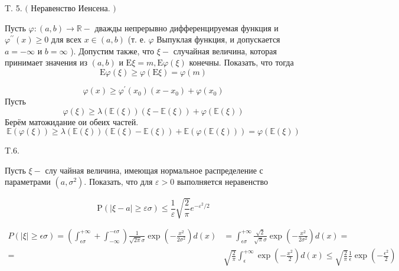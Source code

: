 \documentclass[a4paper,12pt]{article} %
\begin{document}
\begin{example} T. 5. $($ Неравенство Иенсена. $)$ 

Пусть $\varphi:(a, b) \rightarrow \mathbb{R}-$ дважды непрерывно дифференцируемая функция и $\varphi^{\prime \prime}(x) \geq 0$ для всех $x \in(a, b)$ (т. е. $\varphi$ Выпуклая функция, и допускается $a=-\infty$ и $b=\infty$ ). 
Допустим также, что $\xi-$ случайная величина, которая принимает значения из $(a, b)$ и $\mathrm{E} \xi=m, \mathrm{E} \varphi(\xi)$ конечны. Показать, что тогда
$$
\mathrm{E} \varphi(\xi) \geq \varphi(\mathrm{E} \xi)=\varphi(m)
$$



$$
\varphi(x) \geq \varphi^\prime \left(x_{0}\right)\left(x-x_{0}\right)+\varphi\left(x_{0}\right)
$$
Пусть
$$
\varphi(\xi) \geq \lambda(\mathbb{E}(\xi))(\xi-\mathbb{E}(\xi))+\varphi(\mathbb{E}(\xi))
$$
Берём матожидание ои обеих частей.
$$
\mathbb{E}(\varphi(\xi)) \geq \lambda(\mathbb{E}(\xi))(\mathbb{E}(\xi)-\mathbb{E}(\xi))+\mathbb{E}(\varphi(\mathbb{E}(\xi)))=
\varphi(\mathbb{E}(\xi))
$$






\end{example}



\begin{example}



T.6. 


Пусть $\xi-$ слу чайная величина, имеющая нормальное распределение с параметрами $\left(a, \sigma^{2}\right) .$ Показать, что для $\varepsilon>0$ выполняется неравенство

$$
\mathrm{P}(|\xi-a| \geq \varepsilon \sigma) \leq \frac{1}{\varepsilon} \sqrt{\frac{2}{\pi}} e^{-\varepsilon^{2} / 2}
$$



\[ \begin{aligned}
P(|\xi| \geq \epsilon \sigma)
=
\left(\int_{\epsilon \sigma}^{+\infty}
+
\int_{-\infty}^{-\epsilon \sigma}\right) 
\frac{1}{\sqrt{2 \pi} \sigma} 
\exp \left(-\frac{x^{2}}{2 \sigma^{2}}\right) d(x) 
&=
\int_{\epsilon \sigma}^{+\infty} \frac{\sqrt{2}}{\sqrt{\pi} \sigma} \exp \left(-\frac{x^{2}}{2 \sigma^{2}}\right) d(x)
=
\\
=& \sqrt{\frac{2}{\pi}} \int_{\epsilon}^{+\infty} 
\exp \left(-\frac{x^{2}}{2}\right) d(x) 
\leq 
\sqrt{\frac{2}{\pi}} \frac{1}{\epsilon} 
\exp \left(-\frac{\epsilon^{2}}{2}\right)
\end{aligned} \]






\end{example}
\end{document}
